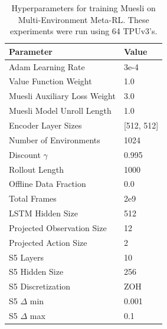 \documentclass{article}
\begin{document}
\newpage
\begin{table}[h]
\centering
\caption{Hyperparameters for training Muesli on Multi-Environment Meta-RL. These experiments were run using 64 TPUv3's.}
\label{tab:meta-params}
\begin{tabular}{l|l}
Parameter & Value \\ \hline
Adam Learning Rate & 3e-4 \\
Value Function Weight & 1.0 \\
Muesli Auxiliary Loss Weight & 3.0 \\
Muesli Model Unroll Length & 1.0 \\
Encoder Layer Sizes & [512, 512] \\
Number of Environments & 1024 \\
Discount $\gamma$ & 0.995 \\
Rollout Length & 1000 \\
Offline Data Fraction & 0.0 \\
Total Frames & 2e9 \\
LSTM Hidden Size & 512 \\
Projected Observation Size & 12 \\
Projected Action Size & 2 \\
S5 Layers & 10 \\
S5 Hidden Size & 256 \\
S5 Discretization & ZOH \\
S5 $\Delta$ min & 0.001 \\
S5 $\Delta$ max & 0.1 \\
\end{tabular}
\end{table}
\newpage
\end{document}
